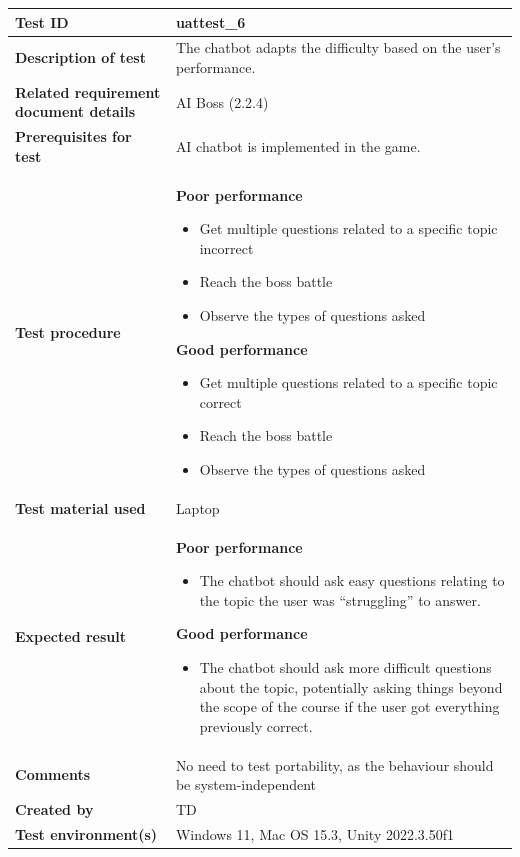 \documentclass[11pt, a4paper]{article}
\begin{document}
\begin{center}
\begin{tabularx}{\linewidth}{|>{\raggedright\arraybackslash}m{4cm}|X|}
    \hline
    \textbf{Test ID} & uattest\_6 \\
    \hline
    \textbf{Description of test} & The chatbot adapts the difficulty based on the user's performance. \\
    \hline
    \textbf{Related requirement document details} & AI Boss (2.2.4) \\
    \hline
    \textbf{Prerequisites for test} & AI chatbot is implemented in the game. \\
    \hline
    \textbf{Test procedure} &
    \textbf{Poor performance}
    \begin{itemize}
        \item Get multiple questions related to a specific topic incorrect
        \item Reach the boss battle
        \item Observe the types of questions asked
    \end{itemize}
    \textbf{Good performance}
    \begin{itemize}
        \item Get multiple questions related to a specific topic correct
        \item Reach the boss battle
        \item Observe the types of questions asked
    \end{itemize}
    \\
    \hline
    \textbf{Test material used} & Laptop \\
    \hline
    \textbf{Expected result} &
    \textbf{Poor performance}
    \begin{itemize}
        \item The chatbot should ask easy questions relating to the topic the user was “struggling” to answer.
    \end{itemize}
    \textbf{Good performance}
    \begin{itemize}
        \item The chatbot should ask more difficult questions about the topic, potentially asking things beyond the scope of the course if the user got everything previously correct.
    \end{itemize}
    \\
    \hline
    \textbf{Comments} & No need to test portability, as the behaviour should be system-independent \\
    \hline
    \textbf{Created by} & TD \\
    \hline
    \textbf{Test environment(s)} & Windows 11, Mac OS 15.3, Unity 2022.3.50f1 \\
    \hline
\end{tabularx}
\end{center}
\end{document}
